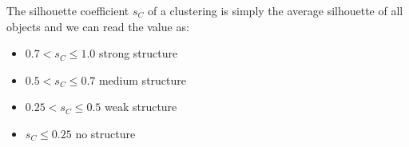    The silhouette coefficient $s_C$ of a clustering is simply the average 
    silhouette of all objects and we can read the value as:
    \begin{itemize}
        \item $0.7 < s_C \leq 1.0$ strong structure
        \item $0.5 < s_C \leq 0.7$ medium structure
        \item $0.25 < s_C \leq 0.5$ weak structure
        \item $s_C \leq 0.25$ no structure
    \end{itemize}
